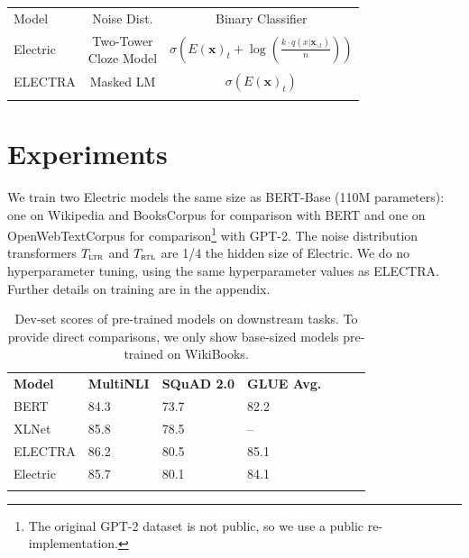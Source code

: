 \documentclass[11pt,a4paper]{article}
\newcommand\tstrut{\rule{0pt}{2.6ex}}
\newcommand\bstrut{\rule[-1.0ex]{0pt}{0pt}}
\newcommand{\thinline}{\Xhline{1.5\arrayrulewidth}}
\newcommand{\thickline}{\Xhline{2.5\arrayrulewidth}}
\newcommand{\tsep}	{\bstrut \\ \thinline}
\newcommand{\ttop}{\thickline}
\newcommand{\tbottom}{\bstrut \\ \thickline}
\newcommand{\bx}{\bm{x}}
\newcommand{\bw}{\bm{w}}
\newcommand{\bh}{\bm{h}}
\newcommand{\cntxt}{\bx_{\backslash t}}
\begin{document}
\small
\renewcommand{\arraystretch}{1.0}
\addtolength{\tabcolsep}{-3pt}
\noindent\begin{tabularx}{\linewidth}{X c c}
  \ttop
  Model & Noise Dist. & Binary Classifier  \tstrut \bstrut \\ \thinline
  Electric & \makecell{Two-Tower\\ Cloze Model} & $\sigma\left(E(\bx)_t + \log\left( \frac{k \cdot q(x | \cntxt)}{n} \right)\right)$ \tstrut  \\
  ELECTRA  & Masked LM \tstrut & $\sigma(E(\bx)_t)$ \tbottom
\end{tabularx} 
\addtolength{\tabcolsep}{3pt}
\renewcommand{\arraystretch}{1.0}
 \normalsize




\section{Experiments}
We train two Electric models the same size as BERT-Base (110M parameters):
one on Wikipedia and BooksCorpus \cite{Zhu2015AligningBA} for comparison with BERT 
and one on OpenWebTextCorpus \cite{Gokaslan2019OpenWeb} for comparison\footnote{The original GPT-2 dataset is not public, so we use a public re-implementation.} with GPT-2.
The noise distribution transformers $T_{\textsc{ltr}}$ and $T_{\textsc{rtl}}$ are 1/4 the hidden size of Electric.
We do no hyperparameter tuning, using the same hyperparameter values as ELECTRA. %
Further details on training are in the appendix.



\addtolength{\tabcolsep}{-2pt}
\begin{table}[tb]
\small
\begin{center}
\begin{tabularx}{\linewidth}{X l l l l }
\ttop
\textbf{Model} & \textbf{MultiNLI} & \textbf{SQuAD 2.0} & \textbf{GLUE Avg.}  \tstrut \tsep
BERT & 84.3 & 73.7 & 82.2 \tstrut \\
XLNet & 85.8 & 78.5 & --  \\
ELECTRA & 86.2 & 80.5 & 85.1  \tsep 
Electric & 85.7 & 80.1 & 84.1  \tstrut 
\tbottom
\end{tabularx} 
\end{center}
\caption{Dev-set scores of pre-trained models on downstream tasks. To provide direct comparisons, we only show base-sized models pre-trained on WikiBooks.}%
\vspace{-1mm}
\label{tab:downstream}
\end{table}
\addtolength{\tabcolsep}{2pt}
\end{document}
